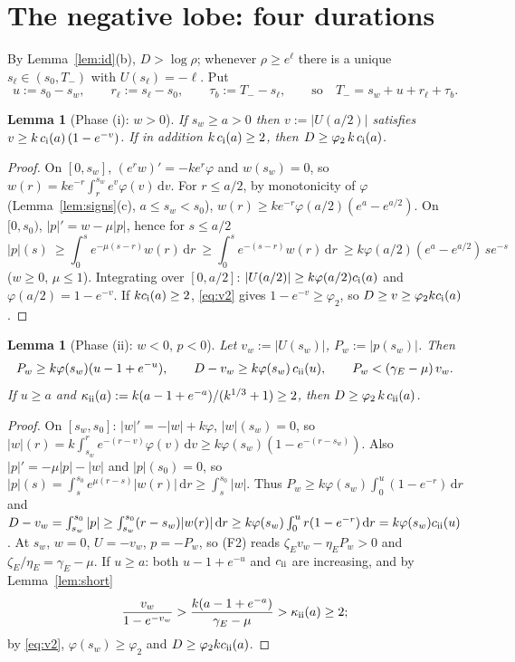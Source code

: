 \documentclass[11pt,a4paper]{article}
\newtheorem{lemma}[theorem]{Lemma}
\theoremstyle{remark}\newtheorem{remark}[theorem]{Remark}
\newcommand{\dd}{\,\mathrm d}
\begin{document}
\section{The negative lobe: four durations}
By Lemma~\ref{lem:id}(b), $D>\log\rho$; whenever $\rho\ge e^{\ell}$ there is a unique
$s_\ell\in(s_0,T_-)$ with $U(s_\ell)=-\ell$. Put
\[
u:=s_0-s_w,\qquad r_\ell:=s_\ell-s_0,\qquad \tau_b:=T_--s_\ell,\qquad\text{so}\quad
T_-=s_w+u+r_\ell+\tau_b .
\]
\begin{lemma}[Phase (i): $w>0$]\label{lem:i}
If $s_w\ge a>0$ then $v:=|U(a/2)|$ satisfies $v\ge k\,c_{\rm i}(a)\,(1-e^{-v})$. If in addition
$k\,c_{\rm i}(a)\ge2$, then $D\ge\varphi_2\,k\,c_{\rm i}(a)$.
\end{lemma}
\begin{proof}
On $[0,s_w]$, $(e^rw)'=-ke^r\varphi$ and $w(s_w)=0$, so $w(r)=ke^{-r}\int_r^{s_w}e^v\varphi(v)\dd v$.
For $r\le a/2$, by monotonicity of $\varphi$ (Lemma~\ref{lem:signs}(c), $a\le s_w<s_0$),
$w(r)\ge ke^{-r}\varphi(a/2)(e^a-e^{a/2})$. On $[0,s_0)$, $|p|'=w-\mu|p|$, hence for $s\le a/2$
\[
|p|(s)\ \ge\int_0^se^{-\mu(s-r)}w(r)\dd r\ \ge\int_0^se^{-(s-r)}w(r)\dd r
\ \ge k\varphi(a/2)(e^a-e^{a/2})\,se^{-s}
\]
($w\ge0$, $\mu\le1$). Integrating over $[0,a/2]$: $|U(a/2)|\ge k\varphi(a/2)c_{\rm i}(a)$ and
$\varphi(a/2)=1-e^{-v}$. If $kc_{\rm i}(a)\ge2$, \eqref{eq:v2} gives $1-e^{-v}\ge\varphi_2$, so
$D\ge v\ge\varphi_2kc_{\rm i}(a)$.
\end{proof}

\begin{lemma}[Phase (ii): $w<0$, $p<0$]\label{lem:ii}
Let $v_w:=|U(s_w)|$, $P_w:=|p(s_w)|$. Then
\[
P_w\ge k\varphi(s_w)(u-1+e^{-u}),\qquad D-v_w\ge k\varphi(s_w)\,c_{\rm ii}(u),\qquad
P_w<(\gamma_E-\mu)\,v_w .
\]
If $u\ge a$ and $\kappa_{\rm ii}(a):=k(a-1+e^{-a})/(k^{1/3}+1)\ge2$, then $D\ge\varphi_2\,k\,c_{\rm ii}(a)$.
\end{lemma}
\begin{proof}
On $[s_w,s_0]$: $|w|'=-|w|+k\varphi$, $|w|(s_w)=0$, so
$|w|(r)=k\int_{s_w}^re^{-(r-v)}\varphi(v)\dd v\ge k\varphi(s_w)(1-e^{-(r-s_w)})$. Also
$|p|'=-\mu|p|-|w|$ and $|p|(s_0)=0$, so $|p|(s)=\int_s^{s_0}e^{\mu(r-s)}|w(r)|\dd r\ge\int_s^{s_0}|w|$.
Thus $P_w\ge k\varphi(s_w)\int_0^u(1-e^{-r})\dd r$ and
$D-v_w=\int_{s_w}^{s_0}|p|\ge\int_{s_w}^{s_0}(r-s_w)|w(r)|\dd r\ge k\varphi(s_w)\int_0^ur(1-e^{-r})\dd r
=k\varphi(s_w)c_{\rm ii}(u)$. At $s_w$, $w=0$, $U=-v_w$, $p=-P_w$, so (F2) reads
$\zeta_Ev_w-\eta_EP_w>0$ and $\zeta_E/\eta_E=\gamma_E-\mu$.
If $u\ge a$: both $u-1+e^{-u}$ and $c_{\rm ii}$ are increasing, and by Lemma~\ref{lem:short}
\[
\frac{v_w}{1-e^{-v_w}}>\frac{k(a-1+e^{-a})}{\gamma_E-\mu}>\kappa_{\rm ii}(a)\ge2 ;
\]
by \eqref{eq:v2},
$\varphi(s_w)\ge\varphi_2$ and $D\ge\varphi_2kc_{\rm ii}(a)$.
\end{proof}
\end{document}
